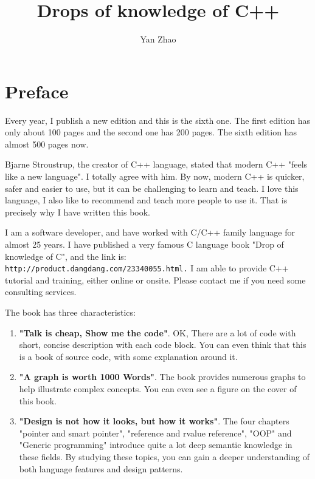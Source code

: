 \documentclass[a4paper,11pt,twoside]{book}
\begin{document}
\title{Drops of knowledge of C++}
\author{Yan Zhao}
\date{}\maketitle

\setcounter{secnumdepth}{4}
\setcounter{tocdepth}{4}
\tableofcontents
\setcounter{page}{1}

\chapter*{Preface}
Every year, I publish a new edition and this is the sixth one. The first edition has only about 100 pages and the second one has 200 pages. The sixth edition has almost 500 pages now.\par \medskip

Bjarne Stroustrup, the creator of C++ language, stated that modern C++  "feels like a new language". I totally agree with him. By now, modern C++ is quicker, safer and easier to use, but it can be challenging to learn and teach. I love this language, I also like to recommend and teach more people to use it. That is precisely why I have written this book.  \par \medskip

I am a software developer, and have worked with C/C++ family language for almost 25 years. I have published a very famous C language book "Drop of knowledge of C", and the link is:\\ \verb|http://product.dangdang.com/23340055.html.| I am able to provide C++ tutorial and training, either online or onsite. Please contact me if you need some consulting services.\par \par \medskip

The book has three characteristics:
\begin{enumerate}
	\item \textbf{"Talk is cheap, Show me the code"}. OK, There are a lot of code with short, concise description with each code block. You can even think that this is a book of source code, with some explanation around it.
	
	\item \textbf{"A graph is worth 1000 Words"}. The book provides numerous graphs to help illustrate complex concepts. You can even see a figure on the cover of this book.
	
	\item \textbf{"Design is not how it looks, but how it works"}. The four chapters "pointer and smart pointer", "reference and rvalue reference", "OOP" and "Generic programming" introduce quite a lot deep semantic knowledge in these fields. By studying these topics, you can gain a deeper understanding of both language features and design patterns.
\end{enumerate}
\end{document}
